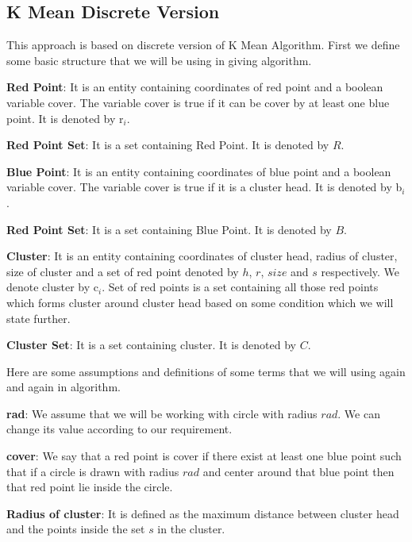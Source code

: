 \documentclass[12pt,a4wide]{report}
\theoremstyle{plain}
\theoremstyle{definition}
\theoremstyle{remark}
\begin{document}
\subsection{K Mean Discrete Version}
This approach is based on discrete version of K Mean Algorithm. First we define some basic structure
that we will be using in giving algorithm.
\begin{description}
 \item \textbf{Red Point}: It is an entity containing coordinates of red point and a boolean variable cover. The variable
 cover is true if it can be cover by at least one blue point. It is denoted by r$_{i}$.
 \item \textbf{Red Point Set}: It is a set containing Red Point. It is denoted by $R$.
 \item \textbf{Blue Point}: It is an entity containing coordinates of blue point and a boolean variable cover. The variable
 cover is true if it is a cluster head. It is denoted by b$_{i}$.
 \item \textbf{Red Point Set}: It is a set containing Blue Point. It is denoted by $B$.
 \item \textbf{Cluster}: It is an entity containing coordinates of cluster head, radius of cluster, size of cluster and a set of red
 point denoted by $h$, $r$, $size$ and $s$ respectively. We denote cluster by c$_{i}$. Set of red points is a set containing all 
 those red points which forms cluster around cluster head based on some condition which we will state further.
 \item \textbf{Cluster Set}: It is a set containing cluster. It is denoted by $C$.
 \end{description}
 Here are some assumptions and definitions of some terms that we will using again and again in algorithm. 
 \begin{description}
 \item \textbf{rad}: We assume that we will be working with circle with radius $rad$. We can change its value according to 
 our requirement.
 \item \textbf{cover}: We say that a red point is cover if there exist at least one blue point such that if a circle is drawn
 with radius $rad$ and center around that blue point then that red point lie inside the circle.
 \item \textbf{Radius of cluster}: It is defined as the maximum distance between cluster head and the points inside the set $s$
 in the cluster.
 \end{description}
\end{document}
